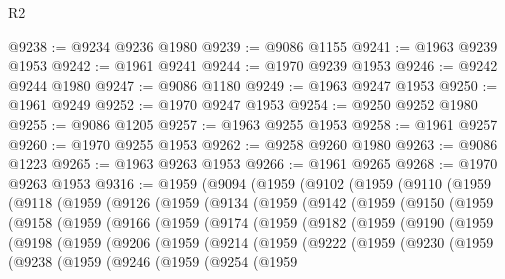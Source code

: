 \begin{lexlean}{R2}
\begin{coremodule}
@9238 := @9234 @9236 @1980
@9239 := @9086 @1155
@9241 := @1963 @9239 @1953
@9242 := @1961 @9241
@9244 := @1970 @9239 @1953
@9246 := @9242 @9244 @1980
@9247 := @9086 @1180
@9249 := @1963 @9247 @1953
@9250 := @1961 @9249
@9252 := @1970 @9247 @1953
@9254 := @9250 @9252 @1980
@9255 := @9086 @1205
@9257 := @1963 @9255 @1953
@9258 := @1961 @9257
@9260 := @1970 @9255 @1953
@9262 := @9258 @9260 @1980
@9263 := @9086 @1223
@9265 := @1963 @9263 @1953
@9266 := @1961 @9265
@9268 := @1970 @9263 @1953
@9316 := @1959
    (@9094
      (@1959
        (@9102
          (@1959
            (@9110
              (@1959
                (@9118
                  (@1959
                    (@9126
                      (@1959
                        (@9134
                          (@1959
                            (@9142
                              (@1959
                                (@9150
                                  (@1959
                                    (@9158
                                      (@1959
                                        (@9166
                                          (@1959
                                            (@9174
                                              (@1959
                                                (@9182
                                                  (@1959
                                                    (@9190
                                                      (@1959
                                                        (@9198
                                                          (@1959
                                                            (@9206
                                                              (@1959
                                                                (@9214
                                                                  (@1959
                                                                    (@9222
                                                                      (@1959
                                                                        (@9230
                                                                          (@1959
                                                                            (@9238
                                                                              (@1959
                                                                                (@9246
                                                                                  (@1959
                                                                                    (@9254
                                                                                      (@1959

\end{coremodule}
\end{lexlean}
